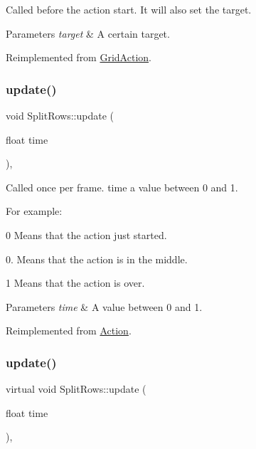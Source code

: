 Called before the action start. It will also set the target.


\begin{DoxyParams}{Parameters}
{\em target} & A certain target. \\
\hline
\end{DoxyParams}


Reimplemented from \hyperlink{classGridAction_a33e2c1bc95bbcf6b16428097b4fd4b61}{Grid\+Action}.

\mbox{\label{classSplitRows_a38725e447edc1ccae1e0b9333192b346}} 
\subsubsection{\texorpdfstring{update()}{update()}\hspace{0.1cm}{\footnotesize\ttfamily [1/2]}}
{\footnotesize\ttfamily void Split\+Rows\+::update (\begin{DoxyParamCaption}\item[{float}]{time }\end{DoxyParamCaption})\hspace{0.3cm}{\ttfamily [override]}, {\ttfamily [virtual]}}

Called once per frame. time a value between 0 and 1.

For example\+:
\begin{DoxyItemize}
\item 0 Means that the action just started.
\item 0. Means that the action is in the middle.
\item 1 Means that the action is over.
\end{DoxyItemize}


\begin{DoxyParams}{Parameters}
{\em time} & A value between 0 and 1. \\
\hline
\end{DoxyParams}


Reimplemented from \hyperlink{classAction_a937e646e63915e33ad05ba149bfcf239}{Action}.

\mbox{\label{classSplitRows_a4d9b103a86551824821990002c263f31}} 
\subsubsection{\texorpdfstring{update()}{update()}\hspace{0.1cm}{\footnotesize\ttfamily [2/2]}}
{\footnotesize\ttfamily virtual void Split\+Rows\+::update (\begin{DoxyParamCaption}\item[{float}]{time }\end{DoxyParamCaption})\hspace{0.3cm}{\ttfamily [override]}, {\ttfamily [virtual]}}

